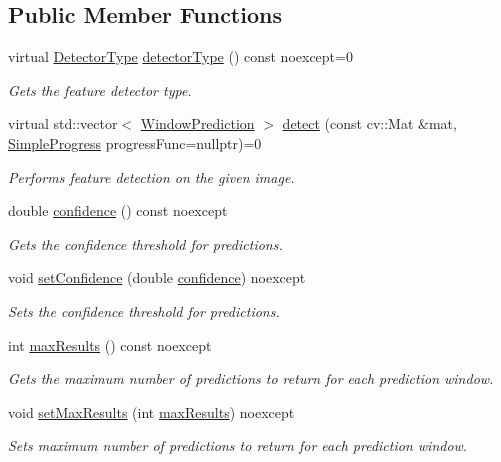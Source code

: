 \subsection*{Public Member Functions}
\begin{DoxyCompactItemize}
\item 
virtual \hyperlink{group___classification_module_ga9fa0b4fe3495e513c3c0746aa0940f41}{Detector\+Type} \hyperlink{group___classification_module_ga6f82560e3b0c2886e919f2e76e766838}{detector\+Type} () const noexcept=0
\begin{DoxyCompactList}\small\item\em Gets the feature detector type. \end{DoxyCompactList}\item 
virtual std\+::vector$<$ \hyperlink{structdg_1_1deepcore_1_1classification_1_1_window_prediction}{Window\+Prediction} $>$ \hyperlink{group___classification_module_gac09a9197de6732069e40b0e3bcbdf94c}{detect} (const cv\+::\+Mat \&mat, \hyperlink{group___utility_module_ga6763018df79e4bdbcd8cd14cea5342b2}{Simple\+Progress} progress\+Func=nullptr)=0
\begin{DoxyCompactList}\small\item\em Performs feature detection on the given image. \end{DoxyCompactList}\item 
double \hyperlink{group___classification_module_ga11004d28f6b88023d1ae1bed44261dc9}{confidence} () const noexcept
\begin{DoxyCompactList}\small\item\em Gets the confidence threshold for predictions. \end{DoxyCompactList}\item 
void \hyperlink{group___classification_module_ga870a49fe3273eacfea12e38aa8360f6f}{set\+Confidence} (double \hyperlink{group___classification_module_ga11004d28f6b88023d1ae1bed44261dc9}{confidence}) noexcept
\begin{DoxyCompactList}\small\item\em Sets the confidence threshold for predictions. \end{DoxyCompactList}\item 
int \hyperlink{group___classification_module_gae2a1d191924996f7d3d0673b8c2da35d}{max\+Results} () const noexcept
\begin{DoxyCompactList}\small\item\em Gets the maximum number of predictions to return for each prediction window. \end{DoxyCompactList}\item 
void \hyperlink{group___classification_module_ga936252ea1133d7c0c2a42ba0afbc2cf0}{set\+Max\+Results} (int \hyperlink{group___classification_module_gae2a1d191924996f7d3d0673b8c2da35d}{max\+Results}) noexcept
\begin{DoxyCompactList}\small\item\em Sets maximum number of predictions to return for each prediction window. \end{DoxyCompactList}\end{DoxyCompactItemize}
